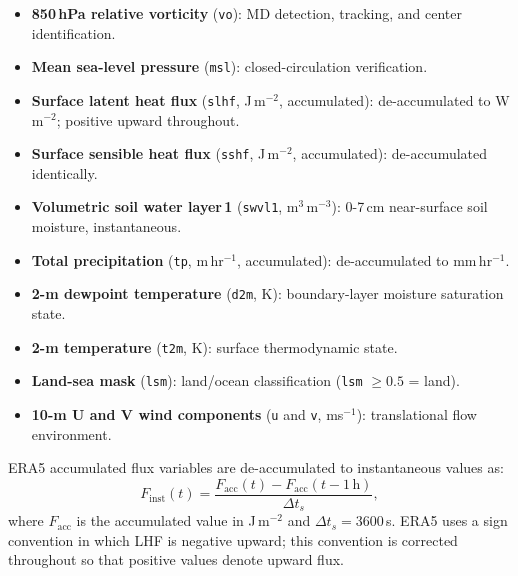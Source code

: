 \begin{itemize}
  \item \textbf{850\,hPa relative vorticity} (\texttt{vo}): MD
    detection, tracking, and center identification.
  \item \textbf{Mean sea-level pressure} (\texttt{msl}):
    closed-circulation verification.
  \item \textbf{Surface latent heat flux} (\texttt{slhf},
    J\,m$^{-2}$, accumulated): de-accumulated to W\,m$^{-2}$;
    positive upward throughout.
  \item \textbf{Surface sensible heat flux} (\texttt{sshf},
    J\,m$^{-2}$, accumulated): de-accumulated identically.
  \item \textbf{Volumetric soil water layer\,1} (\texttt{swvl1},
    m$^3$\,m$^{-3}$): 0-7\,cm near-surface soil moisture, instantaneous.
  \item \textbf{Total precipitation} (\texttt{tp}, m\,hr$^{-1}$,
    accumulated): de-accumulated to mm\,hr$^{-1}$.
  \item \textbf{2-m dewpoint temperature} (\texttt{d2m}, K):
    boundary-layer moisture saturation state.
  \item \textbf{2-m temperature} (\texttt{t2m}, K): surface thermodynamic state.
  \item \textbf{Land-sea mask} (\texttt{lsm}): land/ocean
    classification (\texttt{lsm} $\geq 0.5$ = land).
  \item \textbf{10-m U and V wind components} (\texttt{u} and
    \texttt{v}, ms$^{-1}$): translational flow environment.
\end{itemize}

ERA5 accumulated flux variables are de-accumulated to instantaneous values as:
\begin{equation}
  F_\mathrm{inst}(t) = \frac{F_\mathrm{acc}(t) - F_\mathrm{acc}(t -
  1\,\mathrm{h})}{\Delta t_s},
  \label{eq:deaccumulate}
\end{equation}
where $F_\mathrm{acc}$ is the accumulated value in J\,m$^{-2}$ and
$\Delta t_s = 3600$\,s. ERA5 uses a sign convention in which LHF is
negative upward; this convention is corrected throughout so that
positive values denote upward flux.


